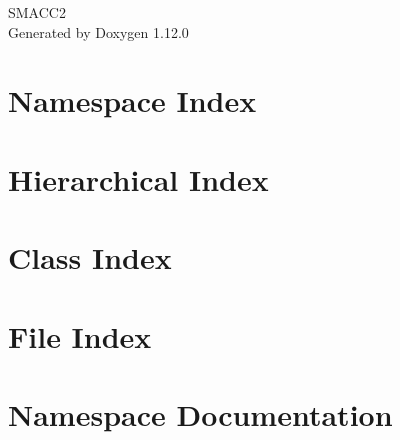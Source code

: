 \documentclass[twoside]{book}
\newcommand{\+}{\discretionary{\mbox{\scriptsize$\hookleftarrow$}}{}{}}
\newcommand{\clearemptydoublepage}{%
    \newpage{\pagestyle{empty}\cleardoublepage}%
  }
\begin{document}
  \raggedbottom
    \hypersetup{pageanchor=false,
                bookmarksnumbered=true,
                pdfencoding=unicode
               }
  \begin{titlepage}
  \vspace*{7cm}
  \begin{center}%
  {\Large SMACC2}\\
  \vspace*{1cm}
  {\large Generated by Doxygen 1.12.0}\\
  \end{center}
  \end{titlepage}
  \clearemptydoublepage
  \tableofcontents
  \clearemptydoublepage
  \hypersetup{pageanchor=true}
\chapter{Namespace Index}

\chapter{Hierarchical Index}

\chapter{Class Index}

\chapter{File Index}

\chapter{Namespace Documentation}




























\end{document}
